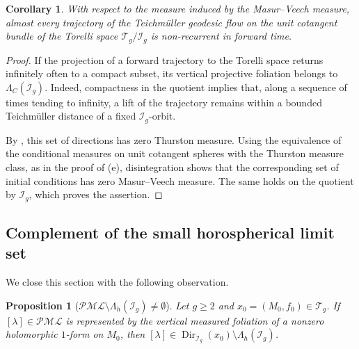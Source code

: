 \documentclass[dvipdfmx]{amsart}
\newtheorem{proposition}{Proposition}[section]
\newtheorem{corollary}{Corollary}[section]
\theoremstyle{remark}
\newcommand{\teich}{\mathcal{T}}
\newcommand{\torelliG}{\mathcal{I}}
\newcommand{\pml}{\mathcal{PML}}
\begin{document}
\begin{corollary}
With respect to the measure induced by the Masur--Veech measure,
almost every trajectory of the Teichm\"uller geodesic flow
on the unit cotangent bundle of the Torelli space
$\teich_g/\torelliG_g$ is non-recurrent in forward time.
\end{corollary}

\begin{proof}
If the projection of a forward trajectory to the
Torelli space returns infinitely often to a compact
subset, its vertical projective foliation belongs
to $\Lambda_C(\torelliG_g)$.
Indeed, compactness in the quotient implies that,
along a sequence of times tending to infinity,
a lift of the trajectory remains within a bounded
Teichm\"uller distance of a fixed
$\torelliG_g$-orbit.

By , this set of
directions has zero Thurston measure.
Using the equivalence of the conditional measures
on unit cotangent spheres with the Thurston
measure class, as in the proof of
(e), disintegration shows
that the corresponding set of initial conditions
has zero Masur--Veech measure.
The same holds on the quotient by $\torelliG_g$,
which proves the assertion.
\end{proof}

\subsection{Complement of the small horospherical limit set}
We close this section with the following observation.

\begin{proposition}[$\pml\setminus \Lambda_h(\torelliG_g)\ne \emptyset$]
\label{prop:complement_small_horospherical_limit_set}
Let $g\ge 2$ and $x_0=(M_0,f_0)\in\teich_g$. If $[\lambda]\in\pml$ is represented by the vertical measured foliation of a nonzero holomorphic $1$-form on $M_0$, then $[\lambda]\in\operatorname{Dir}_{\torelliG_g}(x_0)\setminus\Lambda_h(\torelliG_g)$.
\end{proposition}
\end{document}
